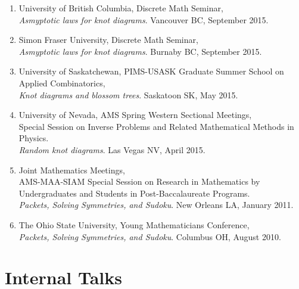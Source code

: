 \documentclass[letterpaper]{article}
\begin{document}
\begin{enumerate}
\item University of British Columbia, Discrete Math Seminar, \\
  \textit{Asmyptotic laws for knot diagrams}. Vancouver BC, September 2015.
  
\item Simon Fraser University, Discrete Math Seminar, \\
  \textit{Asmyptotic laws for knot diagrams}. Burnaby BC, September 2015.

\item University of Saskatchewan, PIMS-USASK Graduate Summer School on Applied Combinatorics, \\
  \textit{Knot diagrams and blossom trees}. Saskatoon SK, May 2015.
  
\item University of Nevada, AMS Spring Western Sectional Meetings,\\
  Special Session on Inverse Problems and Related Mathematical Methods in Physics. \\
  \textit{Random knot diagrams}. Las Vegas NV, April 2015.
  
\item Joint Mathematics Meetings, \\
  AMS-MAA-SIAM Special Session on Research in Mathematics by
  Undergraduates and Students in Post-Baccalaureate Programs.\\
  \textit{Packets, Solving Symmetries, and Sudoku}. New Orleans LA, January 2011.
  
\item The Ohio State University, Young Mathematicians Conference, \\
  \textit{Packets, Solving Symmetries, and Sudoku}. Columbus OH, August 2010.
\end{enumerate}

\section*{Internal Talks}
\end{document}
